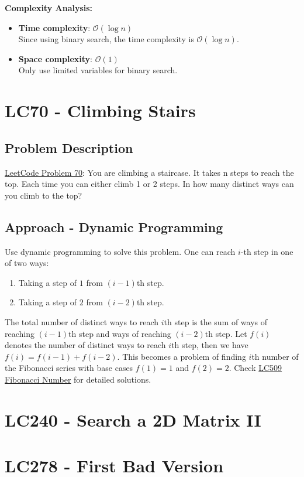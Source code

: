 \documentclass[justified]{tufte-book}
\begin{document}
\noindent \textbf{Complexity Analysis:}
\begin{itemize}
    \item \textbf{Time complexity}: $\mathcal{O}(\log n)$ \\
    Since using binary search, the time complexity is $\mathcal{O}(\log n)$.
    \item \textbf{Space complexity}: $\mathcal{O}(1)$ \\
    Only use limited variables for binary search.
\end{itemize}


\section{LC70 - Climbing Stairs}
\subsection{Problem Description}
\href{https://leetcode.com/problems/climbing-stairs/}{LeetCode Problem 70}: You are climbing a staircase. It takes n steps to reach the top. Each time you can either climb 1 or 2 steps. In how many distinct ways can you climb to the top? 

\subsection{Approach - Dynamic Programming}
Use dynamic programming to solve this problem. One can reach $i$-th step in one of two ways:
\begin{enumerate}
    \item Taking a step of $1$ from $(i-1)$th step.
    \item Taking a step of $2$ from $(i-2)$th step.
\end{enumerate}
The total number of distinct ways to reach $i$th step is the sum of ways of reaching $(i-1)$th step and ways of reaching $(i-2)$th step. Let $f(i)$ denotes the number of distinct ways to reach $i$th step, then we have $f(i) = f(i-1) + f(i-2)$. This becomes a problem of finding $i$th number of the Fibonacci series with base cases $f(1) = 1$ and $f(2) = 2$. Check \hyperref[sec:lc509_fibonacci]{LC509 Fibonacci Number} for detailed solutions.


\section{LC240 - Search a 2D Matrix II}

\section{LC278 - First Bad Version}
\end{document}
